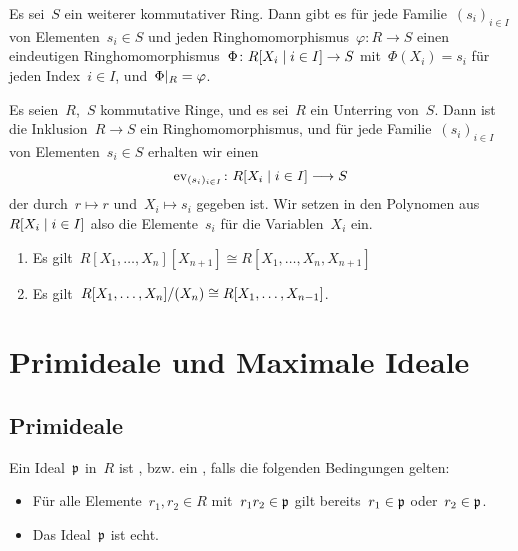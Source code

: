 \begin{theorem}
  Es sei~$S$ ein weiterer kommutativer Ring.
  Dann gibt es für jede Familie~$(s_i)_{i \in I}$ von Elementen~$s_i \in S$ und jeden Ringhomomorphismus~$\varphi \colon R \to S$ einen eindeutigen Ringhomomorphismus~$\Phi \colon R[X_i \suchthat i \in I] \to S$ mit~$\Phi(X_i) = s_i$ für jeden  Index~$i \in I$, und~$\restrict{\Phi}{R} = \varphi$.
\end{theorem}

\begin{example}
  Es seien~$R$,~$S$ kommutative Ringe, und es sei~$R$ ein Unterring von~$S$.
  Dann ist die Inklusion~$R \to S$ ein Ringhomomorphismus, und für jede Familie~$(s_i)_{i \in I}$ von Elementen~$s_i \in S$ erhalten wir einen 
  \[
    \ev_{(s_i)_{i \in I}}
    \colon
    R[X_i \suchthat i \in I]
    \to
    S
  \]
  der durch~$r \mapsto r$ und~$X_i \mapsto s_i$ gegeben ist.
  Wir setzen in den Polynomen aus~$R[X_i \suchthat i \in I]$ also die Elemente~$s_i$ für die Variablen~$X_i$ ein.
\end{example}

\begin{proposition}
  \leavevmode
  \begin{enumerate}
    \item
      Es gilt~$R[X_1, \dotsc, X_n][X_{n+1}] \cong R[X_1, \dotsc, X_n, X_{n+1}]$
    \item
      Es gilt~$R[X_1, \dotsc, X_n] / (X_n) \cong R[X_1, \dotsc, X_{n-1}]$.
  \end{enumerate}
\end{proposition}





\section{Primideale und Maximale Ideale}



\subsection{Primideale}

\begin{definition}
  Ein Ideal~$\mathfrak{p}$ in~$R$ ist , bzw. ein , falls die folgenden Bedingungen gelten:
  \begin{itemize}
    \item
      Für alle Elemente~$r_1, r_2 \in R$ mit~$r_1 r_2 \in \mathfrak{p}$ gilt bereits~$r_1 \in \mathfrak{p}$ oder~$r_2 \in \mathfrak{p}$.
    \item
      Das Ideal~$\mathfrak{p}$ ist echt.
  \end{itemize}
\end{definition}

